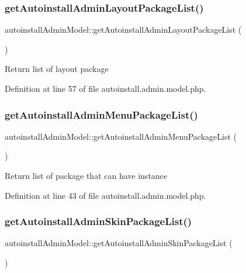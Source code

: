 \subsubsection{\texorpdfstring{get\+Autoinstall\+Admin\+Layout\+Package\+List()}{getAutoinstallAdminLayoutPackageList()}}
{\footnotesize\ttfamily autoinstall\+Admin\+Model\+::get\+Autoinstall\+Admin\+Layout\+Package\+List (\begin{DoxyParamCaption}{ }\end{DoxyParamCaption})}

Return list of layout package 

Definition at line 57 of file autoinstall.\+admin.\+model.\+php.

\mbox{\label{classautoinstallAdminModel_a9cb4da298ab863dec8b7664cac2e42a5}} 
\subsubsection{\texorpdfstring{get\+Autoinstall\+Admin\+Menu\+Package\+List()}{getAutoinstallAdminMenuPackageList()}}
{\footnotesize\ttfamily autoinstall\+Admin\+Model\+::get\+Autoinstall\+Admin\+Menu\+Package\+List (\begin{DoxyParamCaption}{ }\end{DoxyParamCaption})}

Return list of package that can have instance 

Definition at line 43 of file autoinstall.\+admin.\+model.\+php.

\mbox{\label{classautoinstallAdminModel_aee0002dcda8a05d57f8f7e5304be087c}} 
\subsubsection{\texorpdfstring{get\+Autoinstall\+Admin\+Skin\+Package\+List()}{getAutoinstallAdminSkinPackageList()}}
{\footnotesize\ttfamily autoinstall\+Admin\+Model\+::get\+Autoinstall\+Admin\+Skin\+Package\+List (\begin{DoxyParamCaption}{ }\end{DoxyParamCaption})}

